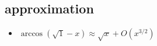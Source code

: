 \documentclass[
]{kaohandt}
\begin{document}
\subsection{approximation}
\begin{itemize}
    \item $\arccos(\sqrt 1-x) \approx \sqrt x + O(x^{3/2})$
\end{itemize}



\printbibliography[title=Bibliography] %
\end{document}
